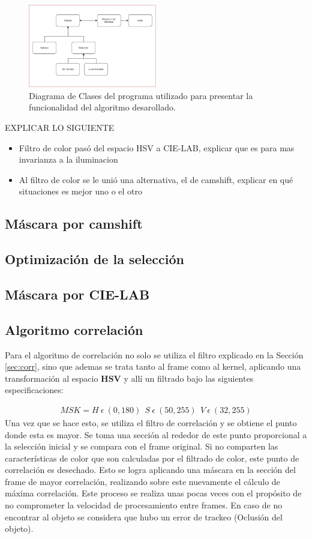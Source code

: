 \begin{figure}
\centering
	\includegraphics[width=0.5\textwidth]{Imagenes/classd.png}
	\caption{Diagrama de Clases del programa utilizado para presentar la funcionalidad del algoritmo desarollado.}
	\label{fig:class}
\end{figure}
EXPLICAR LO SIGUIENTE
\begin{itemize}
\item Filtro de color pasó del espacio HSV a CIE-LAB, explicar que es para mas invarianza a la iluminacion
\item Al filtro de color se le unió una alternativa, el de camshift, explicar en qué situaciones es mejor uno o el otro
\end{itemize}
\subsection{Máscara por camshift}
\subsection{Optimización de la selección}
\subsection{Máscara por CIE-LAB}

\subsection{Algoritmo correlación}
Para el algoritmo de correlación no solo se utiliza el filtro explicado en la Sección \ref{sec:corr}, sino que ademas se trata tanto al frame como al kernel, aplicando una transformación al espacio \textbf{HSV} y allí un filtrado bajo las siguientes especificaciones: 
            
\begin{align}
MSK = H \  \epsilon \ (0,180 ) \ \ S \  \epsilon \ (50,255) \ \ V \ \epsilon \ (32,255)
\end{align}
Una vez que se hace esto, se utiliza el filtro de correlación y se obtiene el punto donde esta es mayor. Se toma una sección al rededor de este punto proporcional a la selección inicial y se compara con el frame original. Si no comparten las características de color que son calculadas por el filtrado de color, este punto de correlación es desechado. Esto se logra aplicando una máscara en la sección del frame de mayor correlación, realizando sobre este nuevamente el cálculo de máxima correlación. Este proceso se realiza unas pocas veces con el propósito de no comprometer la velocidad de procesamiento entre frames. En caso de no encontrar al objeto se considera que hubo un error de trackeo (Oclusión del objeto).\\

